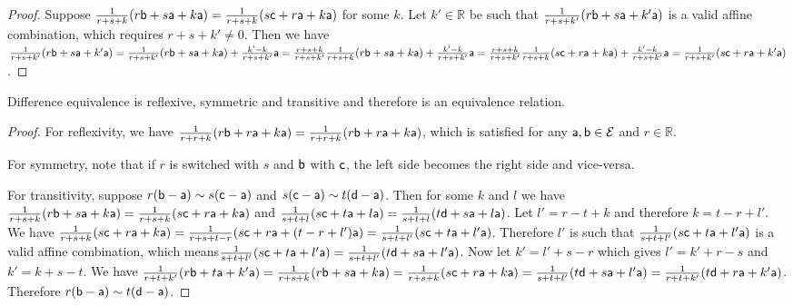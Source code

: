 \begin{mathSection}
	\begin{proof}
		Suppose $\frac{1}{r+s+k} (r \ens[b] + s \ens[a] + k \ens[a]) = \frac{1}{r+s+k} (s \ens[c] + r \ens[a] + k \ens[a])$ for some $k$. Let $k' \in \mathbb{R}$ be such that $\frac{1}{r+s+k'} (r \ens[b] + s \ens[a] + k' \ens[a])$ is a valid affine combination, which requires $r+s+k'\neq0$. Then we have $\frac{1}{r+s+k'} (r \ens[b] + s \ens[a] + k' \ens[a]) = \frac{1}{r+s+k'} (r \ens[b] + s \ens[a] + k \ens[a]) + \frac{k'-k}{r+s+k'} \ens[a] = \frac{r+s+k}{r+s+k'} \frac{1}{r+s+k}(r \ens[b] + s \ens[a] + k \ens[a]) + \frac{k'-k}{r+s+k'} \ens[a] = \frac{r+s+k}{r+s+k'} \frac{1}{r+s+k}(s \ens[c] + r \ens[a] + k \ens[a]) + \frac{k'-k}{r+s+k'} \ens[a] = \frac{1}{r+s+k'} (s \ens[c] + r \ens[a] + k' \ens[a])$.
	\end{proof}
	
	\begin{prop}
		Difference equivalence is reflexive, symmetric and transitive and therefore is an equivalence relation.
	\end{prop}
	
	\begin{proof}
		For reflexivity, we have $\frac{1}{r+r+k} (r \ens[b] + r \ens[a] + k \ens[a]) = \frac{1}{r+r+k} (r \ens[b] + r \ens[a] + k \ens[a])$, which is satisfied for any $\ens[a], \ens[b] \in \Ens$ and $r \in \mathbb{R}$.
		
		For symmetry, note that if $r$ is switched with $s$ and $\ens[b]$ with $\ens[c]$, the left side becomes the right side and vice-versa.
		
		For transitivity, suppose $r(\ens[b] - \ens[a]) \sim s(\ens[c] - \ens[a])$ and $s(\ens[c] - \ens[a]) \sim t(\ens[d] - \ens[a])$. Then for some $k$ and $l$ we have $\frac{1}{r+s+k} (r \ens[b] + s \ens[a] + k \ens[a]) = \frac{1}{r+s+k} (s \ens[c] + r \ens[a] + k \ens[a])$ and $\frac{1}{s+t+l} (s \ens[c] + t \ens[a] + l \ens[a]) = \frac{1}{s+t+l} (t \ens[d] + s \ens[a] + l \ens[a])$. Let $l' = r - t + k$ and therefore $k = t - r + l'$. We have $\frac{1}{r+s+k} (s \ens[c] + r \ens[a] + k \ens[a]) = \frac{1}{r+s+t-r} (s \ens[c] + r \ens[a] + (t-r +l') \ens[a]) = \frac{1}{s+t+l'} (s \ens[c] + t \ens[a] + l' \ens[a])$. Therefore $l'$ is such that $\frac{1}{s+t+l'} (s \ens[c] + t \ens[a] + l' \ens[a])$ is a valid affine combination, which means$\frac{1}{s+t+l'} (s \ens[c] + t \ens[a] + l' \ens[a]) =\frac{1}{s+t+l'} (t \ens[d] + s \ens[a] + l' \ens[a])$. Now let $k' = l' + s -r$ which gives $l' = k' + r -s$ and $k' = k + s - t$. We have $\frac{1}{r+t+k'} (r \ens[b] + t \ens[a] + k' \ens[a]) = \frac{1}{r+s+k} (r \ens[b] + s \ens[a] + k \ens[a]) = \frac{1}{r+s+k} (s \ens[c] + r \ens[a] + k \ens[a]) = \frac{1}{s+t+l'} (t \ens[d] + s \ens[a] + l' \ens[a]) = \frac{1}{r+t+k'} (t \ens[d] + r \ens[a] + k' \ens[a])$. Therefore $r(\ens[b] - \ens[a]) \sim t(\ens[d] - \ens[a])$.
	\end{proof}
	

\end{mathSection}
